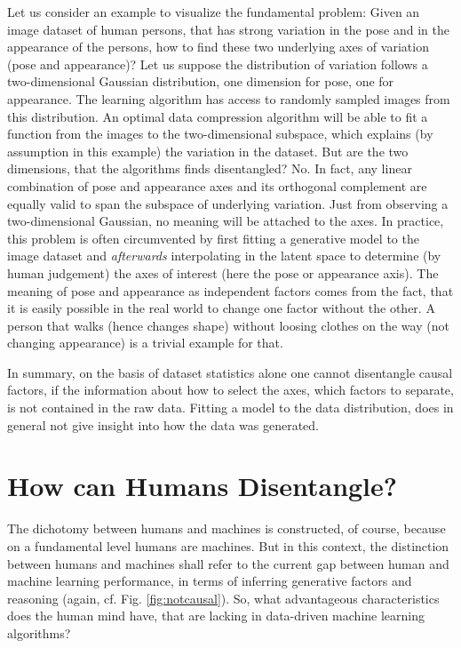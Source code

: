 	Let us consider an example to visualize the fundamental problem: Given an image dataset of human persons, that has strong variation in the pose and in the appearance of the persons, how to find these two underlying axes of variation (pose and appearance)? Let us suppose the distribution of variation follows a two-dimensional Gaussian distribution, one dimension for pose, one for appearance.
	The learning algorithm has access to randomly sampled images from this distribution. An optimal data compression algorithm will be able to fit a function from the images to the two-dimensional subspace, which explains (by assumption in this example) the variation in the dataset.
	But are the two dimensions, that the algorithms finds disentangled? No. In fact, any linear combination of pose and appearance axes and its orthogonal complement are equally valid to span the subspace of underlying variation. Just from observing a two-dimensional Gaussian, no meaning will be attached to the axes. In practice, this problem is often circumvented by first fitting a generative model to the image dataset and \textit{afterwards} interpolating in the latent space to determine (by human judgement) the axes of interest (here the pose or appearance axis). The meaning of pose and appearance as independent factors comes from the fact, that it is easily possible in the real world to change one factor without the other. A person that walks (hence changes shape) without loosing clothes on the way (not changing appearance) is a trivial example for that.

	In summary, on the basis of dataset statistics alone one cannot disentangle causal factors, if the information about how to select the axes, \ie which factors to separate, is not contained in the raw data.
	Fitting a model to the data distribution, does in general not give insight into how the data was generated.

\section{How can Humans Disentangle?}

	The dichotomy between humans and machines is constructed, of course, because on a fundamental level humans are machines.
	But in this context, the distinction between humans and machines shall refer to the current gap between human and machine learning performance, in terms of inferring generative factors and reasoning (again, cf. Fig. \ref{fig:notcausal}).
	So, what advantageous characteristics does the human mind have, that are lacking in data-driven machine learning algorithms?

